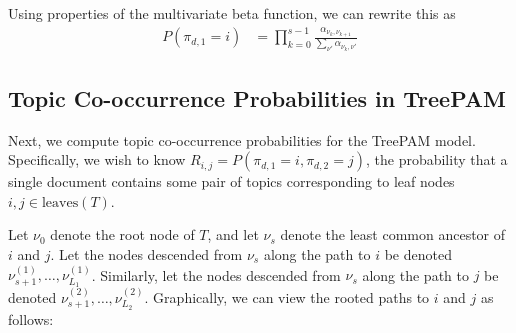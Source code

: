 \documentclass{article}
\theoremstyle{definition}
\newcommand{\leaves}{\text{leaves}}
\begin{document}
Using properties of the multivariate beta function, we can rewrite this as
\begin{align*}
P(\pi_{d,1} = i)
&=
\prod_{k=0}^{s-1}
  \frac{\alpha_{\nu_k,\nu_{k+1}}}
       {\sum_{\nu'} \alpha_{\nu_k,\nu'}}
\end{align*}

\subsection{Topic Co-occurrence Probabilities in TreePAM}
\label{sec:topic-cooccurrence-probabilities}

Next, we compute topic co-occurrence probabilities for the TreePAM model.
Specifically, we wish to know $R_{i,j} = P(\pi_{d,1} = i, \pi_{d,2} = j)$, the probability that a single document contains some pair of topics corresponding to leaf nodes $i, j \in \leaves(T)$.

Let $\nu_0$ denote the root node of $T$, and let $\nu_s$ denote the least common ancestor of $i$ and $j$.
Let the nodes descended from $\nu_s$ along the path to $i$ be denoted $\nu^{(1)}_{s+1}, \ldots, \nu^{(1)}_{L_1}$.
Similarly, let the nodes descended from $\nu_s$ along the path to $j$ be denoted $\nu^{(2)}_{s+1}, \ldots, \nu^{(2)}_{L_2}$.
Graphically, we can view the rooted paths to $i$ and $j$ as follows:
\begin{center}
\end{center}
\end{document}
